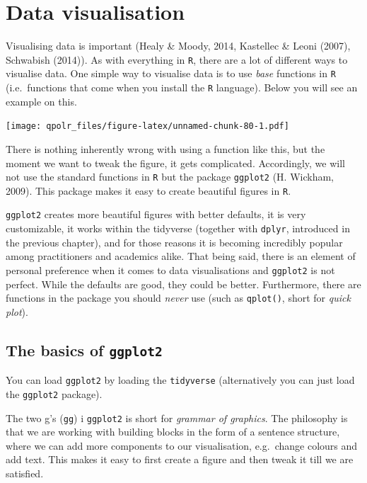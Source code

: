 \documentclass[12pt,oneside]{reedthesis}
\theoremstyle{definition}
\theoremstyle{definition}
\theoremstyle{definition}
\theoremstyle{remark}
\begin{document}
  \chapter{Data visualisation}\label{dataviz}
  
  Visualising data is important (Healy \& Moody, 2014, Kastellec \& Leoni
  (2007), Schwabish (2014)). As with everything in \texttt{R}, there are a
  lot of different ways to visualise data. One simple way to visualise
  data is to use \emph{base} functions in \texttt{R} (i.e.~functions that
  come when you install the \texttt{R} language). Below you will see an
  example on this.
  \begin{Shaded}
  \begin{Highlighting}[]
  \NormalTok{(}\OperatorTok{$}\OperatorTok{$}
  \end{Highlighting}
  \end{Shaded}
  \texttt{[image: qpolr\_files/figure-latex/unnamed-chunk-80-1.pdf]}
  
  There is nothing inherently wrong with using a function like this, but
  the moment we want to tweak the figure, it gets complicated.
  Accordingly, we will not use the standard functions in \texttt{R} but
  the package \texttt{ggplot2} (H. Wickham, 2009). This package makes it
  easy to create beautiful figures in \texttt{R}.
  
  \texttt{ggplot2} creates more beautiful figures with better defaults, it
  is very customizable, it works within the tidyverse (together with
  \texttt{dplyr}, introduced in the previous chapter), and for those
  reasons it is becoming incredibly popular among practitioners and
  academics alike. That being said, there is an element of personal
  preference when it comes to data visualisations and \texttt{ggplot2} is
  not perfect. While the defaults are good, they could be better.
  Furthermore, there are functions in the package you should \emph{never}
  use (such as \texttt{qplot()}, short for \emph{quick plot}).
  
  \section{\texorpdfstring{The basics of
  \texttt{ggplot2}}{The basics of ggplot2}}\label{the-basics-of-ggplot2}
  
  You can load \texttt{ggplot2} by loading the \texttt{tidyverse}
  (alternatively you can just load the \texttt{ggplot2} package).
  \begin{Shaded}
  \begin{Highlighting}[]
  \NormalTok{(}\NormalTok{)}
  \end{Highlighting}
  \end{Shaded}
  The two g's (\texttt{gg}) i \texttt{ggplot2} is short for \emph{grammar
  of graphics}. The philosophy is that we are working with building blocks
  in the form of a sentence structure, where we can add more components to
  our visualisation, e.g.~change colours and add text. This makes it easy
  to first create a figure and then tweak it till we are satisfied.
  
\end{document}
